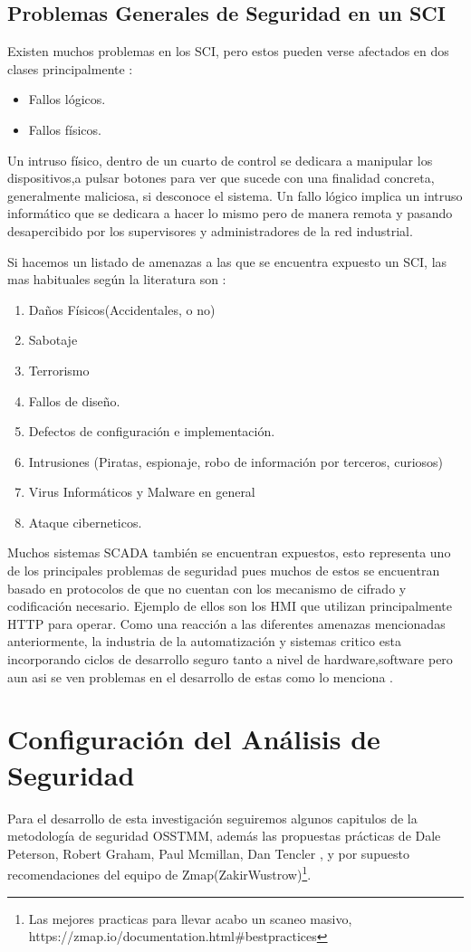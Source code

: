 \documentclass[jou,apacite]{apa6}
\begin{document}
\subsection{Problemas Generales de Seguridad en un SCI }
Existen muchos problemas en los SCI, pero estos pueden verse afectados en dos clases principalmente :
\begin{itemize}  
\item Fallos lógicos.
\item Fallos físicos.
\end{itemize}
Un intruso físico, dentro de un cuarto de control se dedicara a manipular los dispositivos,a pulsar botones para ver que sucede con una finalidad concreta, generalmente maliciosa, si desconoce el sistema. Un fallo lógico implica un intruso informático que se dedicara a hacer lo mismo pero de manera remota y pasando desapercibido por los supervisores y administradores de la red industrial.

Si hacemos un listado de amenazas a las que se encuentra expuesto un SCI, las mas habituales según la literatura\cite{Aquilino} son :
\begin{enumerate}
\item Daños Físicos(Accidentales, o no)
\item Sabotaje
\item Terrorismo
\item Fallos de diseño.
\item Defectos de configuración e implementación.
\item Intrusiones (Piratas, espionaje, robo de información por terceros, curiosos)
\item Virus Informáticos y Malware en general
\item Ataque ciberneticos.
\end{enumerate}

Muchos sistemas SCADA también se encuentran expuestos\cite{Knapp:2011:INS:2597834}, esto representa uno de los principales problemas de seguridad pues muchos de estos se encuentran basado en protocolos de que no cuentan con los mecanismo de cifrado y codificación necesario. Ejemplo de ellos son los HMI que utilizan principalmente HTTP para operar. Como una reacción a las diferentes amenazas mencionadas anteriormente, la industria de la automatización y sistemas critico esta incorporando ciclos de desarrollo seguro tanto a nivel de hardware,software pero aun asi se ven problemas en el desarrollo de estas como lo menciona \cite{Eireann}.

\section{Configuración del Análisis de Seguridad}
Para el desarrollo de esta investigación seguiremos algunos  capitulos de la metodología de seguridad OSSTMM, además las propuestas prácticas de Dale Peterson\cite{Dale}, Robert Graham, Paul Mcmillan, Dan Tencler \cite{Robert}, y por supuesto recomendaciones del equipo de Zmap(ZakirWustrow)\footnote{Las mejores practicas para llevar acabo un scaneo masivo, https://zmap.io/documentation.html\#bestpractices}.
\end{document}
